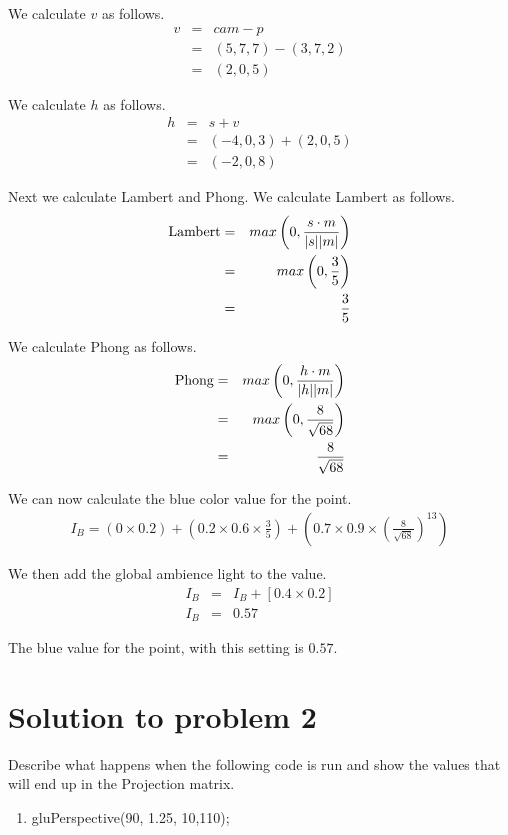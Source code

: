 \documentclass[12pt]{article}
\begin{document}
We calculate $v$ as follows.
\begin{eqnarray*}
    v &=& cam - p\\
    &=& (5,7,7) - (3,7,2)\\
    &=& (2, 0, 5)
\end{eqnarray*}

We calculate $h$ as follows.
\begin{eqnarray*}
    h &=& s+v\\
    &=& (-4,0,3) + (2,0,5)\\
    &=& (-2, 0, 8)
\end{eqnarray*}

Next we calculate Lambert and Phong. We calculate Lambert as follows.
\begin{eqnarray*}
    \textnormal{Lambert} &=& max\left( 0, \frac{s \cdot m}{|s||m|} \right)\\
    &=& max\left( 0, \frac{3}{5} \right)\\
    &=& \frac{3}{5}
\end{eqnarray*}

We calculate Phong as follows.
\begin{eqnarray*}
    \textnormal{Phong} &=& max\left( 0, \frac{h \cdot m}{|h||m|} \right)\\
    &=& max\left( 0, \frac{8}{\sqrt{68}} \right)\\
    &=& \frac{8}{\sqrt{68}}
\end{eqnarray*}

We can now calculate the blue color value for the point.
\begin{eqnarray*}
    I_B = (0 \times 0.2) + \left(0.2 \times 0.6 \times \frac{3}{5}\right) + \left(0.7 \times 0.9 \times \left(\frac{8}{\sqrt{68}}\right)^{13}\right)
\end{eqnarray*}

We then add the global ambience light to the value.
\begin{eqnarray*}
    I_B &=& I_B + \left[ 0.4 \times 0.2 \right]\\
    I_B &=& 0.57
\end{eqnarray*}

The blue value for the point, with this setting is $0.57$.


\pagebreak
\section*{Solution to problem 2}
Describe what happens when the following code is run and show the values that
will end up in the Projection matrix.
\begin{enumerate}
    \item gluPerspective(90, 1.25, 10,110);
\end{enumerate}
\end{document}
